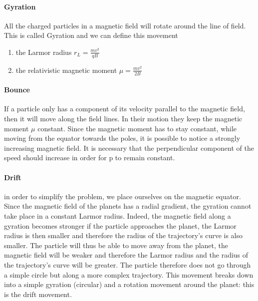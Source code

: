 \documentclass[./dissertation.tex]{subfiles}
\begin{document}
\paragraph{Gyration}
All the charged particles in a magnetic field will rotate around the line of field. This is called Gyration and we can define this movement 
\begin{enumerate}
    \item the Larmor radius $r_L = \frac{mv^2}{qB}$ 
    \item the relativistic magnetic moment $\mu = \frac{mv^2}{2B}$
\end{enumerate}


\paragraph{Bounce}
If a particle only has a component of its velocity parallel to the magnetic field, then it will move along the field lines. In their motion they keep the magnetic moment $\mu$ constant. Since the magnetic moment has to stay constant, while moving from the equator towards the poles, it is possible to notice a strongly increasing magnetic field. It is necessary that the
perpendicular component of the speed should increase in order
for p to remain constant.\cite{bib2}

\paragraph{Drift}
in order to simplify the problem, we place ourselves on the magnetic equator. Since the magnetic field of the planets has a radial gradient, the gyration cannot take place in a constant Larmor radius. Indeed, the magnetic field along a gyration becomes stronger if the particle approaches the planet, the Larmor radius is then smaller and therefore the radius of the trajectory's curve is also smaller. The particle will thus be able to move away from the planet, the magnetic field will be weaker and therefore the Larmor radius and the radius of the trajectory's curve will be greater. The particle therefore does not go through a simple circle but along a more complex trajectory. This movement breaks down into a simple gyration (circular) and a rotation movement around the planet: this is the drift movement.
\end{document}
